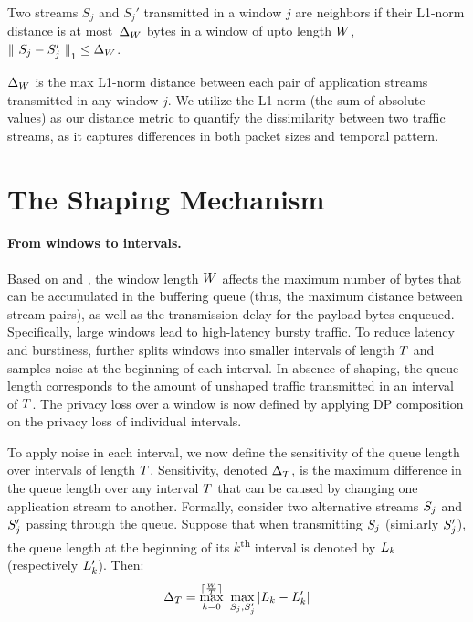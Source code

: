 \begin{definition}
Two streams $S_{j}$ and $S_{j}'$ transmitted in a window $j$
are neighbors
if their L1-norm distance is at most~$\Delta_{W}$ bytes in a window of upto length $W$, \ie ${\|~S_{j} - S_{j}'~\|}_1 \leq \Delta_{W}$.
\label{def:neighboring-streams}
\end{definition}

$\Delta_{W}$ is the max L1-norm distance between each pair of application streams transmitted in any window $j$.
We utilize the L1-norm (the sum of absolute values) as our distance metric to quantify the dissimilarity between two traffic streams, as it captures differences in both packet sizes and temporal pattern.


\section{The Shaping Mechanism}
\label{subsec:dp-queue-measurements}
\paragraph{From windows to intervals.}
Based on  and , the window length $W$ affects the maximum number of bytes that can be accumulated in the buffering queue (thus, the maximum distance between stream pairs), as well as the transmission delay for the payload bytes enqueued.
Specifically, large windows lead to high-latency bursty traffic.
To reduce latency and burstiness, {\sys} further splits windows into smaller intervals of length $T$ and samples noise at the beginning of each interval.
In absence of shaping, the queue length corresponds to the amount of unshaped traffic transmitted in an interval of $T$.
The privacy loss over a window is now defined by applying DP composition on the privacy loss of individual intervals.

To apply noise in each interval, we now define the sensitivity of the queue  length over intervals of length $T$.
Sensitivity, denoted $\Delta_T$, is the maximum difference in the queue length over any interval $T$ that can be caused by changing one application stream to another.
Formally, consider two alternative streams $S_{j}$ and $S_{j}'$ passing through the queue.
Suppose that when transmitting $S_{j}$ (similarly $S_{j}'$), the queue length at the beginning of its $k$\textsuperscript{th} interval is denoted by $L_{k}$ (respectively $L_{k}'$). Then:
\begin{equation}
    \Delta_T = \max_{k = 0}^{\lceil \frac{W}{T} \rceil}~\max_{S_{j},
        S_{j}'} | L_{k} - L_{k}' |
    \label{eqn:ssens}
\end{equation}


